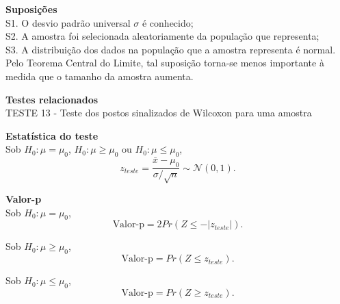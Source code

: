 \documentclass[
]{book}
\theoremstyle{definition}
\theoremstyle{definition}
\theoremstyle{definition}
\theoremstyle{remark}
\begin{document}
\textbf{Suposições}\\
S1. O desvio padrão universal \(\sigma\) é conhecido;\\
S2. A amostra foi selecionada aleatoriamente da população que representa;\\
S3. A distribuição dos dados na população que a amostra representa é normal. Pelo Teorema Central do Limite, tal suposição torna-se menos importante à medida que o tamanho da amostra aumenta.

\textbf{Testes relacionados}\\
TESTE 13 - Teste dos postos sinalizados de Wilcoxon para uma amostra

\textbf{Estatística do teste}\\
Sob \(H_0: \mu = \mu_0\), \(H_0: \mu \ge \mu_0\) ou \(H_0: \mu \le \mu_0\),
\begin{equation}
z_{teste}=\frac{\bar{x}-\mu_0}{\sigma/\sqrt{n}} \sim \mathcal{N}(0,1).
\label{eq:z-teste-media-uni}
\end{equation}

\textbf{Valor-p}\\
Sob \(H_0: \mu = \mu_0\),
\begin{equation}
\text{Valor-p} = 2Pr(Z \le -|z_{teste}|).
\label{eq:z-teste-media-uni-p-bi}
\end{equation}

Sob \(H_0: \mu \ge \mu_0\),
\begin{equation}
\text{Valor-p} = Pr(Z \le z_{teste}).
\label{eq:z-teste-media-uni-p-uni-inf}
\end{equation}

Sob \(H_0: \mu \le \mu_0\),
\begin{equation}
\text{Valor-p} = Pr(Z \ge z_{teste}).
\label{eq:z-teste-media-uni-p-uni-sup}
\end{equation}
\end{document}
